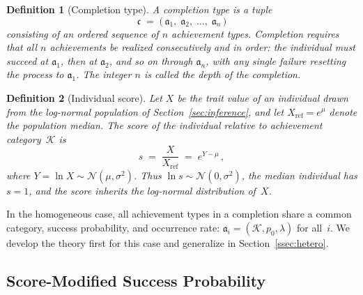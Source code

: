 \documentclass{article}
\newtheorem{definition}{Definition}
\begin{document}
\begin{definition}[Completion type]\label{def:completion}
A \emph{completion type} is a tuple
\[
  \mathfrak{c}
  \;=\;
  \bigl(\,\mathfrak{a}_1,\;\mathfrak{a}_2,\;\ldots,\;\mathfrak{a}_n\,\bigr)
\]
consisting of an ordered sequence of $n$ achievement types.
Completion requires that all $n$ achievements be realized
\emph{consecutively and in order}: the individual must succeed at
$\mathfrak{a}_1$, then at $\mathfrak{a}_2$, and so on through
$\mathfrak{a}_n$, with any single failure resetting the process to
$\mathfrak{a}_1$. The integer $n$ is called the \emph{depth} of the
completion.
\end{definition}

\begin{definition}[Individual score]\label{def:score}
Let $X$ be the trait value of an individual drawn from the log-normal
population of Section~\ref{sec:inference}, and let
$X_{\mathrm{ref}} = e^{\mu}$ denote the population median. The
\emph{score} of the individual relative to achievement category~$\mathcal{K}$
is
\begin{equation}\label{eq:score}
  s \;=\; \frac{X}{X_{\mathrm{ref}}} \;=\; e^{Y - \mu}\,,
\end{equation}
where $Y = \ln X \sim \mathcal{N}(\mu,\sigma^2)$. Thus $\ln s \sim
\mathcal{N}(0,\sigma^2)$, the median individual has $s = 1$, and the
score inherits the log-normal distribution of~$X$.
\end{definition}

In the homogeneous case, all achievement types in a completion share a
common category, success probability, and occurrence rate:
$\mathfrak{a}_i = (\mathcal{K}, p_0, \lambda)$ for all~$i$. We develop
the theory first for this case and generalize in
Section~\ref{ssec:hetero}.

\subsection{Score-Modified Success Probability}\label{ssec:modified-p}
\end{document}

